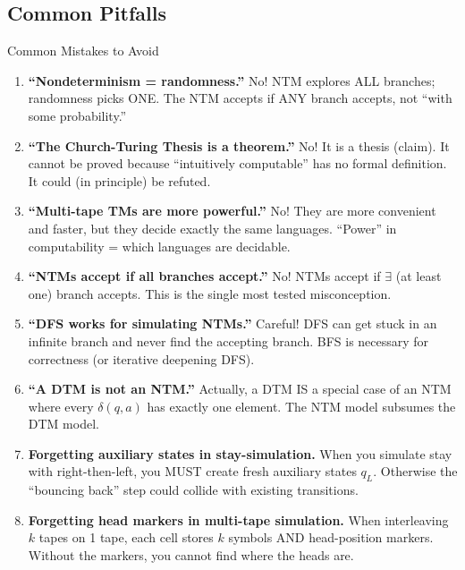 \documentclass[11pt,a4paper]{article}
\begin{document}
\subsection{Common Pitfalls}

\begin{conceptbox}{Common Mistakes to Avoid}
\begin{enumerate}[nosep]
\item \textbf{``Nondeterminism = randomness.''} No! NTM explores ALL branches; randomness picks ONE. The NTM accepts if ANY branch accepts, not ``with some probability.''

\item \textbf{``The Church-Turing Thesis is a theorem.''} No! It is a thesis (claim). It cannot be proved because ``intuitively computable'' has no formal definition. It could (in principle) be refuted.

\item \textbf{``Multi-tape TMs are more powerful.''} No! They are more convenient and faster, but they decide exactly the same languages. ``Power'' in computability = which languages are decidable.

\item \textbf{``NTMs accept if all branches accept.''} No! NTMs accept if $\exists$ (at least one) branch accepts. This is the single most tested misconception.

\item \textbf{``DFS works for simulating NTMs.''} Careful! DFS can get stuck in an infinite branch and never find the accepting branch. BFS is necessary for correctness (or iterative deepening DFS).

\item \textbf{``A DTM is not an NTM.''} Actually, a DTM IS a special case of an NTM where every $\delta(q,a)$ has exactly one element. The NTM model subsumes the DTM model.

\item \textbf{Forgetting auxiliary states in stay-simulation.} When you simulate stay with right-then-left, you MUST create fresh auxiliary states $q_L$. Otherwise the ``bouncing back'' step could collide with existing transitions.

\item \textbf{Forgetting head markers in multi-tape simulation.} When interleaving $k$ tapes on 1 tape, each cell stores $k$ symbols AND head-position markers. Without the markers, you cannot find where the heads are.
\end{enumerate}
\end{conceptbox}
\end{document}
